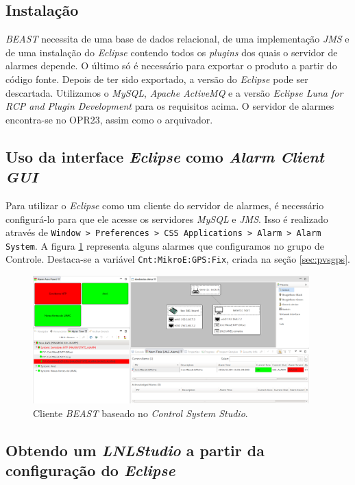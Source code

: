 \subsection{Instalação}

\textit{BEAST} necessita de uma base de dados relacional, de uma implementação
\textit{JMS} e de uma instalação do \textit{Eclipse} contendo todos os
\textit{plugins} dos quais o servidor de alarmes depende. O último só é
necessário para exportar o produto a partir do código fonte. Depois
de ter sido exportado, a versão do \textit{Eclipse} pode ser
descartada. Utilizamos o \textit{MySQL}, \textit{Apache
ActiveMQ} e a versão \textit{Eclipse Luna for RCP and Plugin Development} para
os requisitos acima. O servidor de alarmes encontra-se no OPR23, assim
como o arquivador.


\subsection{Uso da interface \textit{Eclipse} como \textit{Alarm Client GUI}}

Para utilizar o \textit{Eclipse} como um cliente do servidor de alarmes, é
necessário configurá-lo para que ele acesse os servidores \textit{MySQL} e
\textit{JMS}. Isso é realizado através de \texttt{Window > Preferences > CSS
Applications > Alarm > Alarm System}. A figura \ref{fig:alarm}
representa alguns alarmes que configuramos no grupo de Controle. Destaca-se a
variável \texttt{Cnt:MikroE:GPS:Fix}, criada na seção \ref{sec:pvsgps}.

\begin{figure}[h]
\centering
\includegraphics[width=0.95\textwidth]{image/beast-screen-shot}
\caption {Cliente \textit{BEAST} baseado no \textit{Control System Studio}.}
\label{fig:alarm}
\end{figure}

\subsection {Obtendo um \textit{LNLStudio} a partir da configuração do
\textit{Eclipse}}


